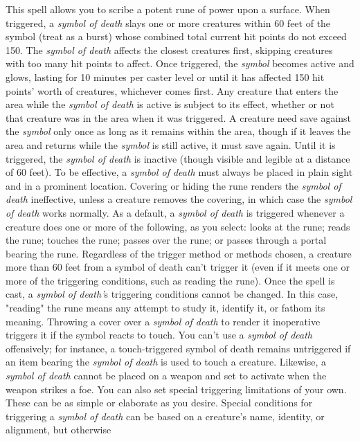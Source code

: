This spell allows you to scribe a potent rune of power upon a surface. When triggered,
a \textit{symbol of death} slays one or more creatures within 60 feet of the symbol
(treat as a burst) whose combined total current hit points do not exceed 150. The
\textit{symbol of death} affects the closest creatures first, skipping creatures
with too many hit points to affect. Once triggered, the \textit{symbol} becomes
active and glows, lasting for 10 minutes per caster level or until it has affected
150 hit points' worth of creatures, whichever comes first. Any creature that enters
the area while the \textit{symbol of death} is active is subject to its effect,
whether or not that creature was in the area when it was triggered. A creature
need save against the \textit{symbol} only once as long as it remains within the
area, though if it leaves the area and returns while the \textit{symbol} is still
active, it must save again.
Until it is triggered, the \textit{symbol of death} is inactive (though visible
and legible at a distance of 60 feet). To be effective, a \textit{symbol of death
}must always be placed in plain sight and in a prominent location. Covering or
hiding the rune renders the \textit{symbol of death} ineffective, unless a creature
removes the covering, in which case the \textit{symbol of death} works normally.
As a default, a \textit{symbol of death} is triggered whenever a creature does
one or more of the following, as you select: looks at the rune; reads the rune;
touches the rune; passes over the rune; or passes through a portal bearing the
rune. Regardless of the trigger method or methods chosen, a creature more than
60 feet from a symbol of death can't trigger it (even if it meets one or more of
the triggering conditions, such as reading the rune). Once the spell is cast, a
\textit{symbol of death'}s triggering conditions cannot be changed.
In this case, "reading" the rune means any attempt to study it, identify it,
or fathom its meaning. Throwing a cover over a \textit{symbol of death} to render
it inoperative triggers it if the symbol reacts to touch. You can't use a \textit{symbol
of death} offensively; for instance, a touch-triggered symbol of death remains
untriggered if an item bearing the \textit{symbol of death} is used to touch a
creature. Likewise, a \textit{symbol of death} cannot be placed on a weapon and
set to activate when the weapon strikes a foe.
You can also set special triggering limitations of your own. These can be as simple
or elaborate as you desire. Special conditions for triggering a \textit{symbol
of death} can be based on a creature's name, identity, or alignment, but otherwise
